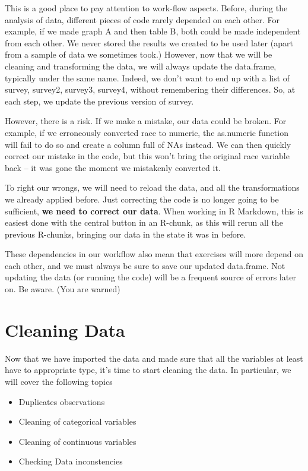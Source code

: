 \documentclass[]{tufte-book}
\providecommand{\tightlist}{%
  \setlength{\itemsep}{0pt}\setlength{\parskip}{0pt}}
\begin{document}
This is a good place to pay attention to work-flow aspects. Before, during the analysis of data, different pieces of code rarely depended on each other. For example, if we made graph A and then table B, both could be made independent from each other. We never stored the results we created to be used later (apart from a sample of data we sometimes took.) However, now that we will be cleaning and transforming the data, we will always update the data.frame, typically under the same name. Indeed, we don't want to end up with a list of survey, survey2, survey3, survey4, without remembering their differences. So, at each step, we update the previous version of survey.

However, there is a risk. If we make a mistake, our data could be broken. For example, if we erroneously converted race to numeric, the as.numeric function will fail to do so and create a column full of NAs instead. We can then quickly correct our mistake in the code, but this won't bring the original race variable back -- it was gone the moment we mistakenly converted it.

To right our wrongs, we will need to reload the data, and all the transformations we already applied before. Just correcting the code is no longer going to be sufficient, \textbf{we need to correct our data}. When working in R Markdown, this is easiest done with the central button in an R-chunk, as this will rerun all the previous R-chunks, bringing our data in the state it was in before.

These dependencies in our workflow also mean that exercises will more depend on each other, and we must always be sure to save our updated data.frame. Not updating the data (or running the code) will be a frequent source of errors later on. Be aware. (You are warned)

\hypertarget{cleaning-data}{%
\section{Cleaning Data}\label{cleaning-data}}

Now that we have imported the data and made sure that all the variables at least have to appropriate type, it's time to start cleaning the data. In particular, we will cover the following topics

\begin{itemize}
\tightlist
\item
  Duplicates observations
\item
  Cleaning of categorical variables
\item
  Cleaning of continuous variables
\item
  Checking Data inconstencies
\end{itemize}
\end{document}

